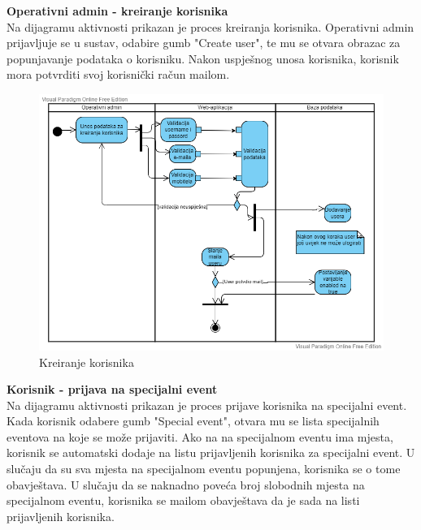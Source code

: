    \textbf{Operativni admin - kreiranje korisnika}\\

		   \text Na dijagramu aktivnosti prikazan je proces kreiranja korisnika. Operativni admin prijavljuje se u sustav, odabire gumb "Create user", te mu se otvara obrazac za popunjavanje podataka o korisniku. Nakon uspješnog unosa korisnika, korisnik mora potvrditi svoj korisnički račun mailom.  


		   \begin{figure}[H]
		   \includegraphics[scale=0.60]{slike/Creating user.vpd.png} %
		   
		   \centering
		   \caption{Kreiranje korisnika}
		   \label{fig:dijagram_aktivnosti_operativni_admin}
		   \end{figure}

  \textbf{Korisnik - prijava na specijalni event}\\

		   \text Na dijagramu aktivnosti prikazan je proces prijave korisnika na specijalni event. Kada korisnik odabere gumb "Special event", otvara mu se lista specijalnih eventova na koje se može prijaviti. Ako na na specijalnom eventu ima mjesta, korisnik se automatski dodaje na listu prijavljenih korisnika za specijalni event. U slučaju da su sva mjesta na specijalnom eventu popunjena, korisnika se o tome obavještava. U slučaju da se naknadno poveća broj slobodnih mjesta na specijalnom eventu, korisnika se mailom obavještava da je sada na listi prijavljenih korisnika.  


